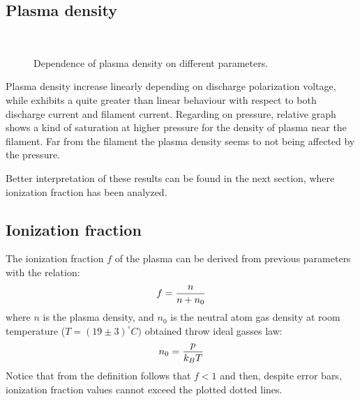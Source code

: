 \documentclass[11pt,a4 paper]{article}
\let\oldfrac\frac
\renewcommand{\frac}[3][d]{\ifthenelse{\equal{#1}{d}}{\oldfrac{#2}{#3}}{\nicefrac{#2}{#3}}}
\begin{document}
\subsection{Plasma density}
\begin{figure}[H]
\\%
 \caption{Dependence of plasma density on different parameters.}\label{fig:n}%
\end{figure}%
Plasma density increase linearly depending on discharge polarization voltage, while exhibits a quite greater than linear behaviour with respect to both discharge current and filament current. Regarding on pressure, relative graph shows a kind of saturation at higher pressure for the density of plasma near the filament. Far from the filament the plasma density seems to not being affected by the pressure.

Better interpretation of these results can be found in the next section, where ionization fraction has been analyzed.


\subsection{Ionization fraction}
The ionization fraction $f$ of the plasma can be derived from previous parameters with the relation:
\[f=\frac n{n+n_0}\]
where $n$ is the plasma density, and $n_0$ is the neutral atom gas density at room temperature ($T=(19\pm3)^\circ C)$ obtained throw ideal gasses law:
\[n_0=\frac p{k_BT}\]
Notice that from the definition follows that $f<1$ and then, despite error bars, ionization fraction values cannot exceed the plotted dotted lines.
\end{document}
